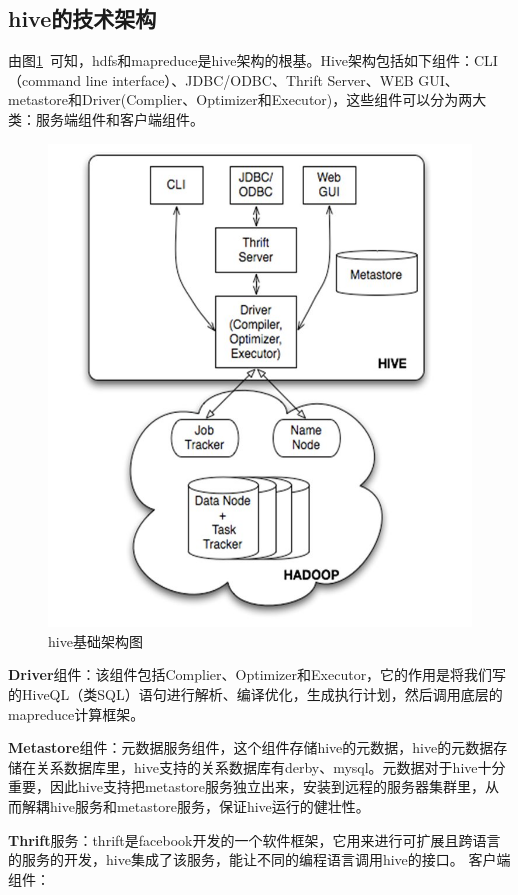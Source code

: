 \subsection{hive的技术架构}
\par 由图\ref{fig-hive-1}~可知，hdfs和mapreduce是hive架构的根基。Hive架构包括如下组件：CLI（command line interface）、JDBC/ODBC、Thrift Server、WEB GUI、metastore和Driver(Complier、Optimizer和Executor)，这些组件可以分为两大类：服务端组件和客户端组件。
\begin{figure}[htbp]
\centering\includegraphics[width=.6\linewidth]{figures/hive.png}
\caption{hive基础架构图}\label{fig-hive-1}
\end{figure} 
\par \textbf{Driver}组件：该组件包括Complier、Optimizer和Executor，它的作用是将我们写的HiveQL（类SQL）语句进行解析、编译优化，生成执行计划，然后调用底层的mapreduce计算框架。
\par \textbf{Metastore}组件：元数据服务组件，这个组件存储hive的元数据，hive的元数据存储在关系数据库里，hive支持的关系数据库有derby、mysql。元数据对于hive十分重要，因此hive支持把metastore服务独立出来，安装到远程的服务器集群里，从而解耦hive服务和metastore服务，保证hive运行的健壮性。
\par \textbf{Thrift}服务：thrift是facebook开发的一个软件框架，它用来进行可扩展且跨语言的服务的开发，hive集成了该服务，能让不同的编程语言调用hive的接口。
客户端组件：

